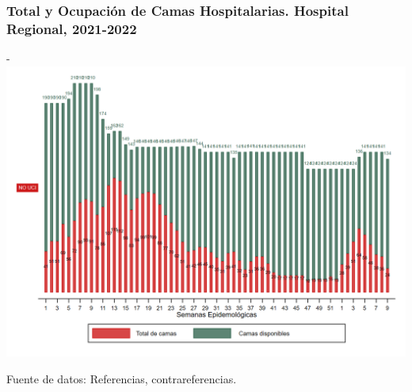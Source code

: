 \documentclass[xcolor=table]{beamer}
\begin{document}
	\begin{frame}
		\frametitle{Total y Ocupación de Camas Hospitalarias. Hospital Regional, 2021-2022}
		\vspace{-.2cm}
		\begin{center}
	-		\includegraphics[width=0.8\linewidth, trim={0cm .5cm 0cm 0.2cm},clip]{../figuras/h_regional_nouci.png}
			
			\begin{table}[]
			\end{table}
			
		\end{center}
		{\tiny Fuente de datos: Referencias, contrareferencias.}
	\end{frame}
	
\end{document}
